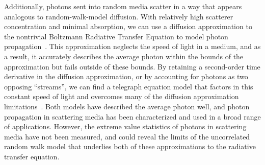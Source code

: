 Additionally, photons sent into random media scatter in a way that appears analogous to random-walk-model diffusion. With relatively high scatterer concentration and minimal absorption, we can use a diffusion approximation to the nontrivial Boltzmann Radiative Transfer Equation to model photon propagation~\cite{ishimaru_wave_1997}. This approximation neglects the speed of light in a medium, and as a result, it accurately describes the average photon within the bounds of the approximation but fails outside of these bounds.
By retaining a second-order time derivative in the diffusion approximation, or by accounting for photons as two opposing ``streams'', we can find a telegraph equation model that factors in this constant speed of light and overcomes many of the diffusion approximation limitations~\cite{lemieux_diffusing-light_1998}.
Both models have described the average photon well, and photon propagation in scattering media has been characterized and used in a broad range of applications. However, the extreme value statistics of photons in scattering media have not been measured, and could reveal the limits of the uncorrelated random walk model that underlies both of these approximations to the radiative transfer equation.


